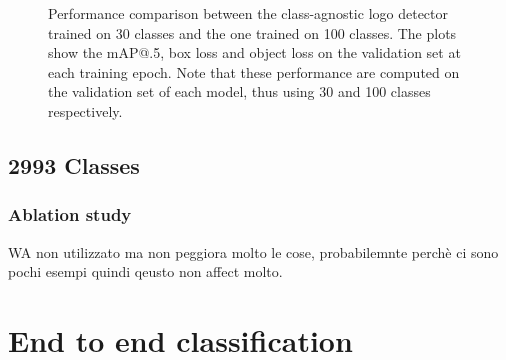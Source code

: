 \begin{figure}[H]
	\centering
    \qquad
    \qquad
    \caption{Performance comparison between the class-agnostic logo detector trained on 30 classes and the one trained on 100 classes. The plots show the mAP@.5, box loss and object loss on the validation set at each training epoch. Note that these performance are computed on the validation set of each model, thus using 30 and 100 classes respectively.}%
	\label{fig:exp-det_100}
\end{figure}


\subsection{2993 Classes}
\subsubsection{Ablation study}
WA non utilizzato ma non peggiora molto le cose, probabilemnte perchè ci sono pochi esempi quindi qeusto non affect molto.


\section{End to end classification}
\label{sec:exp-end2end}
